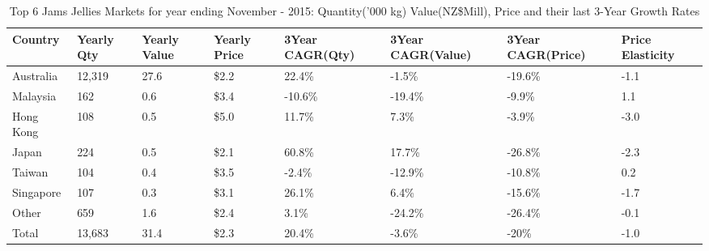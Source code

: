 \begin{table}[ht]
\centering
{\scriptsize
\begin{tabular}[t]{p{1.8cm}>{\hfill}p{1.4cm}>{\hfill}p{1.4cm}>{\hfill}p{1.6cm}>{\hfill}p{1.9cm}>{\hfill}p{2cm}>{\hfill}p{1.9cm}>{\hfill}p{1.5cm}}
 \textbf{Country} & \textbf{Yearly Qty} & \textbf{Yearly Value} & \textbf{Yearly Price} & \textbf{3Year CAGR(Qty)} & \textbf{3Year CAGR(Value)} & \textbf{3Year CAGR(Price)} & \textbf{Price Elasticity} \\
\hline
Australia & 12,319 & 27.6 & \$2.2 & 22.4\% & -1.5\% & -19.6\% & -1.1 \\  
Malaysia & 162 & 0.6 & \$3.4 & -10.6\% & -19.4\% & -9.9\% & 1.1 \\  
Hong Kong & 108 & 0.5 & \$5.0 & 11.7\% & 7.3\% & -3.9\% & -3.0 \\  
Japan & 224 & 0.5 & \$2.1 & 60.8\% & 17.7\% & -26.8\% & -2.3 \\  
Taiwan & 104 & 0.4 & \$3.5 & -2.4\% & -12.9\% & -10.8\% & 0.2 \\  
Singapore & 107 & 0.3 & \$3.1 & 26.1\% & 6.4\% & -15.6\% & -1.7 \\  
Other & 659 & 1.6 & \$2.4 & 3.1\% & -24.2\% & -26.4\% & -0.1 \\  
Total & 13,683 & 31.4 & \$2.3 & 20.4\% & -3.6\% & -20\% & -1.0 \\  
\hline
\end{tabular}
}
\caption{\scriptsize Top 6 Jams Jellies Markets for year ending November - 2015: Quantity('000 kg) Value(NZ\$Mill), Price and their last 3-Year Growth Rates}
\end{table}

